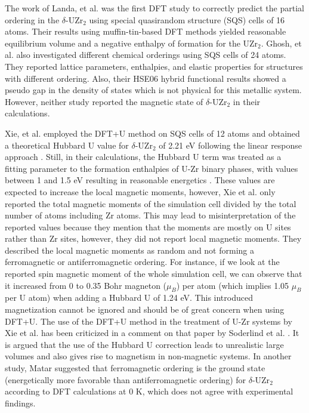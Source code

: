 \documentclass[preprint,12pt]{elsarticle}
\begin{document}
The work of Landa, et al. \cite{landa_density-functional_2009} was the first DFT study to correctly predict the partial ordering in the $\delta$-UZr$_2$ using special quasirandom structure (SQS) cells of 16 atoms. Their results using muffin-tin-based DFT methods yielded reasonable equilibrium volume and a negative enthalpy of formation for the UZr$_2$.
Ghosh, et al. \cite{ghosh_chemical_2021} also investigated different chemical orderings using SQS cells of 24 atoms. They reported lattice parameters, enthalpies, and elastic properties for structures with different ordering.  Also, their HSE06 hybrid functional results showed a pseudo gap in the density of states which is not physical for this metallic system. However, neither study \cite{landa_density-functional_2009, ghosh_chemical_2021} reported the magnetic state of $\delta$-UZr$_2$ in their calculations.

Xie, et al. \cite{xie_correlation_2013} employed the DFT+U method on SQS cells of 12 atoms and obtained a theoretical Hubbard U value for $\delta$-UZr$_2$ of 2.21 eV following the linear response approach \cite{cococcioni_linear_2005}. Still, in their calculations, the Hubbard U term was treated as a fitting parameter to the formation enthalpies of U-Zr binary phases, with values between 1 and 1.5 eV resulting in reasonable energetics \cite{xie_correlation_2013}. These values are expected to increase the local magnetic moments, however, Xie et al. \cite{xie_correlation_2013} only reported the total magnetic moments of the simulation cell divided by the total number of atoms including Zr atoms. This may lead to misinterpretation of the reported values because they mention that the moments are mostly on U sites rather than Zr sites, however, they did not report local magnetic moments. They described the local magnetic moments as random and not forming a ferromagnetic or antiferromagnetic ordering. For instance, if we look at the reported spin magnetic moment of the whole simulation cell, we can observe that it increased from 0 to 0.35 Bohr magneton ($\mu_B$) per atom (which implies 1.05 $\mu_B$ per U atom) when adding a Hubbard U of 1.24 eV. This introduced magnetization cannot be ignored and should be of great concern when using DFT+U. The use of the DFT+U method in the treatment of U-Zr systems by Xie et al. \cite{xie_correlation_2013} has been criticized in a comment on that paper by Soderlind et al. \cite{soderlind_comment_2014}. It is argued that the use of the Hubbard U correction leads to unrealistic large volumes and also gives rise to magnetism in non-magnetic systems. In another study, Matar \cite{matar_first_2017} suggested that ferromagnetic ordering is the ground state (energetically more favorable than antiferromagnetic ordering) for $\delta$-UZr$_2$ according to DFT calculations at 0 K, which does not agree with experimental findings. 
\end{document}
